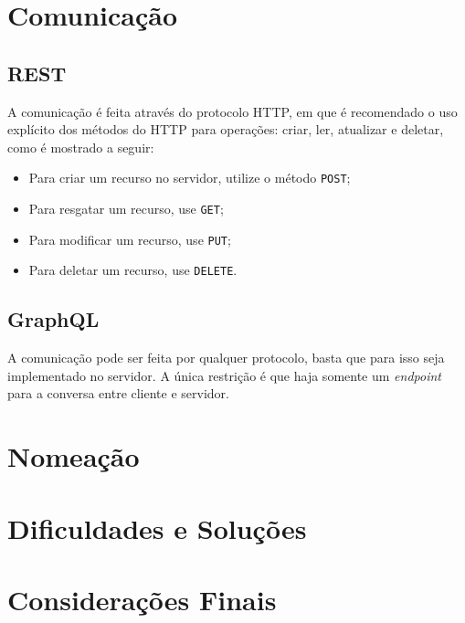 \section{Comunicação}\label{comunicauxe7uxe3o}

\subsection{REST}\label{rest-1}

A comunicação é feita através do protocolo HTTP, em que é recomendado o
uso explícito dos métodos do HTTP para operações: criar, ler, atualizar
e deletar, como é mostrado a seguir:

\begin{itemize}
\itemsep1pt\parskip0pt
\item
  Para criar um recurso no servidor, utilize o método \texttt{POST};
\item
  Para resgatar um recurso, use \texttt{GET};
\item
  Para modificar um recurso, use \texttt{PUT};
\item
  Para deletar um recurso, use \texttt{DELETE}.
\end{itemize}

\subsection{GraphQL}\label{graphql-1}

A comunicação pode ser feita por qualquer protocolo, basta que para isso
seja implementado no servidor. A única restrição é que haja somente um
\emph{endpoint} para a conversa entre cliente e servidor.

\section{Nomeação}\label{nomeauxe7uxe3o}

\section{Dificuldades e Soluções}\label{dificuldades-e-soluuxe7uxf5es}

\section{Considerações Finais}\label{considerauxe7uxf5es-finais}
